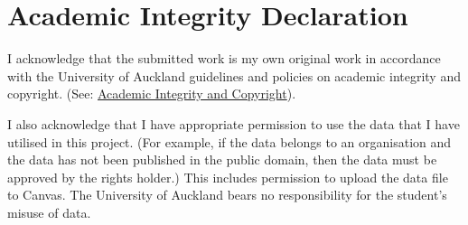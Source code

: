 \documentclass[sigplan,screen]{acmart}
\begin{document}

\section*{Academic Integrity Declaration}

I acknowledge that the submitted work is my own original work in accordance with the University of Auckland guidelines and policies on academic integrity and copyright. (See: \href{https://www.auckland.ac.nz/en/students/forms-policies-and-guidelines/student-policies-and-guidelines/academic-integrity-copyright.html}{Academic Integrity and Copyright}).

I also acknowledge that I have appropriate permission to use the data that I have utilised in this project. (For example, if the data belongs to an organisation and the data has not been published in the public domain, then the data must be approved by the rights holder.) This includes permission to upload the data file to Canvas. The University of Auckland bears no responsibility for the student's misuse of data.




\end{document}
